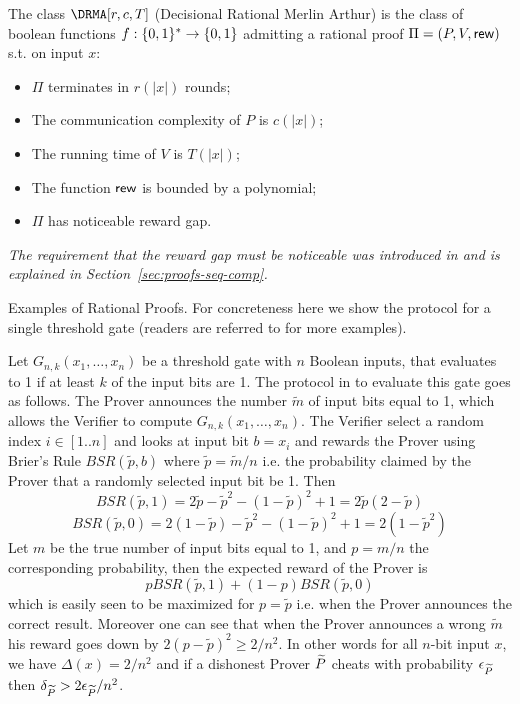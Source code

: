 \begin{definition}
The class $\DRMA[r, c, T]$ (Decisional Rational Merlin Arthur)
is the class of boolean functions $f : \{0, 1\}^{*} \to \{0, 1\}$ admitting a rational proof $\Pi = (P,V, \mathsf{rew})$ s.t. on input $x$:
\begin{itemize}
    \item $\Pi$ terminates in $r(|x|)$ rounds;
    \item The communication complexity of $P$ is $c(|x|)$;
    \item The running time of $V$ is $T(|x|)$;
    \item The function $\mathsf{rew}$ is bounded by a polynomial;
    \item $\Pi$ has noticeable reward gap.
\end{itemize}
\end{definition}

\noindent
\begin{remark}
\label{rem:asy}
{\em The requirement that the reward gap must be noticeable was introduced in 
\cite{am1,ratargs} and is explained in Section~\ref{sec:proofs-seq-comp}.}
\end{remark}

\label{sec:example}
\smallskip
\noindent
{\sc Examples of Rational Proofs.} For concreteness here we show the protocol for a single threshold gate (readers are referred to \cite{am,am1,rosen} for more examples). 

Let $G_{n,k}(x_1,\ldots,x_n)$ be a threshold gate with $n$ Boolean inputs, that evaluates to 1 if at least $k$ of the input bits are 1. The protocol in \cite{am1} to evaluate this gate goes as follows. The Prover announces the number $\tilde{m}$ of input bits equal to 1, which allows the Verifier to compute $G_{n,k}(x_1,\ldots,x_n)$. The Verifier select a random index $i \in [1..n]$ and looks at input bit $b=x_i$ and rewards the Prover using Brier's Rule $BSR(\tilde{p},b)$ where $\tilde{p}=\tilde{m}/n$ i.e. the probability claimed by the Prover that a randomly selected input bit be 1. Then
\[BSR(\tilde{p},1) = 2\tilde{p} - \tilde{p}^2 - (1-\tilde{p})^2 + 1 = 2\tilde{p}(2-\tilde{p}) \]
\[BSR(\tilde{p},0) = 2(1-\tilde{p}) - \tilde{p}^2 - (1-\tilde{p})^2 +1 = 2(1-\tilde{p}^2) \]
Let $m$ be the true number of input bits equal to 1, and $p=m/n$ the corresponding probability, then the expected reward of the Prover is
\begin{equation}
\label{eq:bsr}
p BSR(\tilde{p},1) + (1-p) BSR(\tilde{p},0) 
\end{equation}
which is easily seen to be maximized for $p=\tilde{p}$ i.e. when the Prover announces the correct result. Moreover one can see that when the Prover announces a wrong $\tilde{m}$ his reward goes down by $2(p-\tilde{p})^2 \geq 2/n^2$. In other words 
for all $n$-bit input $x$, we have $\Delta(x)=2/n^2$ and if a dishonest Prover $\widetilde{P}$ cheats with probability $\epsilon_{\widetilde{P}}$ then $\delta_{\widetilde{P}} > 2\epsilon_{\widetilde{P}}/n^2$. 




